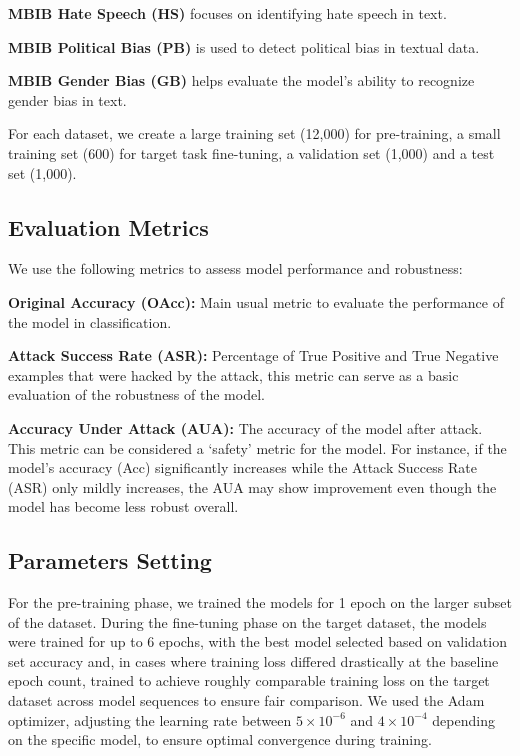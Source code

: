 \documentclass{article}
\begin{document}
\textbf{MBIB Hate Speech (HS)} focuses on identifying hate speech in text. 

\textbf{MBIB Political Bias (PB)} is used to detect political bias in textual data. 

\textbf{MBIB Gender Bias (GB)} helps evaluate the model's ability to recognize gender bias in text.

For each dataset, we create a large training set (12,000) for pre-training, a small training set (600) for target task fine-tuning, a validation set (1,000) and a test set (1,000).

\subsection{Evaluation Metrics}
We use the following metrics to assess model performance and robustness:

\textbf{Original Accuracy (OAcc):} Main usual metric to evaluate the performance of the model in classification.

\textbf{Attack Success Rate (ASR):} Percentage of True Positive and True Negative examples that were hacked by the attack, this metric can serve as a basic evaluation of the robustness of the model.

\textbf{Accuracy Under Attack (AUA): } The accuracy of the model after attack. This metric can be considered a `safety' metric for the model. For instance, if the model's accuracy (Acc) significantly increases while the Attack Success Rate (ASR) only mildly increases, the AUA may show improvement even though the model has become less robust overall.

\subsection{Parameters Setting}

For the pre-training phase, we trained the models for 1 epoch on the larger subset of the dataset. During the fine-tuning phase on the target dataset, the models were trained for up to 6 epochs, with the best model selected based on validation set accuracy and, in cases where training loss differed drastically at the baseline epoch count, trained to achieve roughly comparable training loss on the target dataset across model sequences to ensure fair comparison. We used the Adam optimizer, adjusting the learning rate between $5 \times 10^{-6}$ and $4 \times 10^{-4}$ depending on the specific model, to ensure optimal convergence during training.
\end{document}
